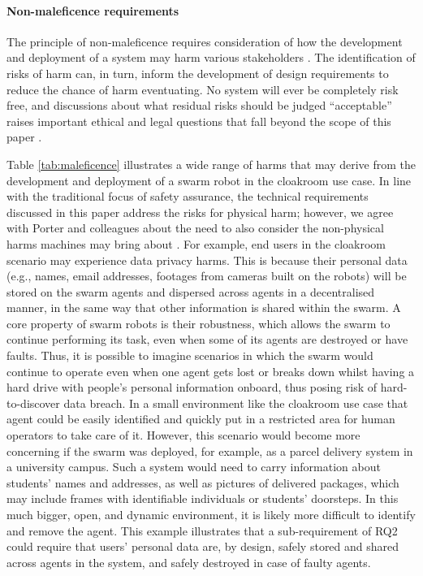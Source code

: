 \documentclass[lettersize,journal]{IEEEtran}
\begin{document}
\paragraph*{Non-maleficence requirements}
The principle of non-maleficence requires consideration of how the development and deployment of a system may harm various stakeholders \cite{Porter2022}. The identification of risks of harm can, in turn, inform the development of design requirements to reduce the chance of harm eventuating. No system will ever be completely risk free, and discussions about what residual risks should be judged ``acceptable” raises important ethical and legal questions that fall beyond the scope of this paper \cite{fraser2021residual}.

Table \ref{tab:maleficence} illustrates a wide range of harms that may derive from the development and deployment of a swarm robot in the cloakroom use case. In line with the traditional focus of safety assurance, the technical requirements discussed in this paper address the risks for physical harm; however, we agree with Porter and colleagues about the need to also consider  the non-physical harms machines may bring about \cite{Porter2022}. For example, end users in the cloakroom scenario may experience data privacy harms. This is because their personal data (e.g., names, email addresses, footages from cameras built on the robots) will be stored on the swarm agents and dispersed across agents in a decentralised manner, in the same way that other information is shared within the swarm. A core property of swarm robots is their robustness, which allows the swarm to continue performing its task, even when some of its agents are destroyed or have faults. Thus, it is possible to imagine scenarios in which the swarm would continue to operate even when one agent gets lost or breaks down whilst having a hard drive with people’s personal information onboard, thus posing risk of hard-to-discover data breach. In a small environment like the cloakroom use case that agent could be easily identified and quickly put in a restricted area for human operators to take care of it. However, this scenario would become more concerning if the swarm was deployed, for example, as a parcel delivery system in a university campus. Such a system would need to carry information about students’ names and addresses, as well as pictures of delivered packages, which may include frames with identifiable individuals or students’ doorsteps. In this much bigger, open, and dynamic environment, it is likely more difficult to identify and remove the agent. This example illustrates that a sub-requirement of RQ2 could require that users’ personal data are, by design, safely stored and shared across agents in the system, and safely destroyed in case of faulty agents.  
\\
\end{document}
